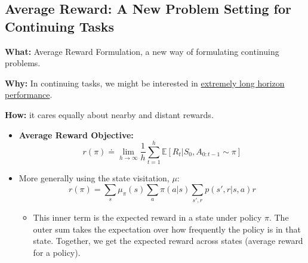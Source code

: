 \documentclass[12pt, a4paper]{article}
\begin{document}
\subsection{Average Reward: A New Problem Setting for Continuing Tasks}\label{awerage-reward-problem-setting-for-continuing-tasks}


\textbf{What:} Average Reward Formulation, a new way of formulating continuing problems.

\textbf{Why:} In continuing tasks, we might be interested in \uline{extremely long horizon performance}.

\textbf{How:} it cares equally about nearby and distant rewards.


\begin{itemize}
  \item \textbf{Average Reward Objective:}
  $$
  r(\pi) \doteq \lim_{h\to\infty} \frac{1}{h} \sum_{t=1}^h \mathbb{E}[R_t | S_0, A_{0:t-1} \sim \pi]
  $$
  \item More generally using the state visitation, $\mu$:
  $$
  r(\pi) = \sum_s \mu_\pi(s) \sum_a \pi(a | s) \sum_{s',r} p(s',r|s,a)r
  $$
  \begin{itemize}
    \item This inner term is the expected reward in a state under policy $\pi$. The outer sum takes the expectation over how frequently the policy is in that state. Together, we get the expected reward across states (average reward for a policy).
  \end{itemize}
\end{itemize}
\end{document}
